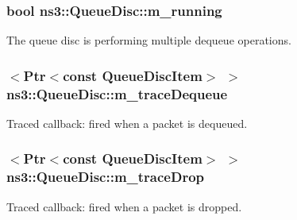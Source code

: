\subsubsection[{\texorpdfstring{m\+\_\+running}{m_running}}]{\setlength{\rightskip}{0pt plus 5cm}bool ns3\+::\+Queue\+Disc\+::m\+\_\+running\hspace{0.3cm}{\ttfamily [private]}}\hypertarget{classns3_1_1QueueDisc_a6d00230b60de29bd32d0a2488290380f}{}\label{classns3_1_1QueueDisc_a6d00230b60de29bd32d0a2488290380f}


The queue disc is performing multiple dequeue operations. 

\subsubsection[{\texorpdfstring{m\+\_\+trace\+Dequeue}{m_traceDequeue}}]{$<${\bf Ptr}$<$const {\bf Queue\+Disc\+Item}$>$ $>$ ns3\+::\+Queue\+Disc\+::m\+\_\+trace\+Dequeue\hspace{0.3cm}{\ttfamily [private]}}\hypertarget{classns3_1_1QueueDisc_a1be3a308037b0feb28ae284b9be04bfc}{}\label{classns3_1_1QueueDisc_a1be3a308037b0feb28ae284b9be04bfc}


Traced callback\+: fired when a packet is dequeued. 

\subsubsection[{\texorpdfstring{m\+\_\+trace\+Drop}{m_traceDrop}}]{$<${\bf Ptr}$<$const {\bf Queue\+Disc\+Item}$>$ $>$ ns3\+::\+Queue\+Disc\+::m\+\_\+trace\+Drop\hspace{0.3cm}{\ttfamily [private]}}\hypertarget{classns3_1_1QueueDisc_a4d59074e7f6aa601eee90f5cd87d423f}{}\label{classns3_1_1QueueDisc_a4d59074e7f6aa601eee90f5cd87d423f}


Traced callback\+: fired when a packet is dropped. 

